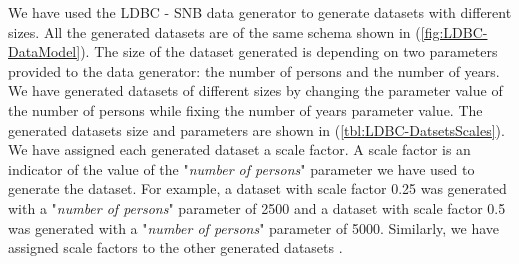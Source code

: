 {We have used the LDBC - SNB data generator to generate datasets with different sizes. All the generated datasets are of the same schema shown in (\ref{fig:LDBC-DataModel}). The size of the dataset generated is depending on two parameters provided to the data generator: the number of persons and the number of years. We have generated datasets of different sizes by changing the parameter value of the number of persons while fixing the number of years parameter value. The generated datasets size and parameters are shown in (\ref{tbl:LDBC-DatsetsScales}). We have assigned each generated dataset a scale factor. A scale factor is an indicator of the value of the "\textit{number of persons}" parameter we have used to generate the dataset. For example, a dataset with scale factor 0.25 was generated with a "\textit{number of persons}" parameter of 2500 and a dataset with scale factor 0.5 was generated with a "\textit{number of persons}" parameter of 5000. Similarly, we have assigned scale factors to the other generated datasets \cite{prat2017ldbc}.

\begin{table}[h]
\centering
{}
\caption{The generated datasets size and parameters}
\label{tbl:LDBC-DatsetsScales}
\end{table}

}

